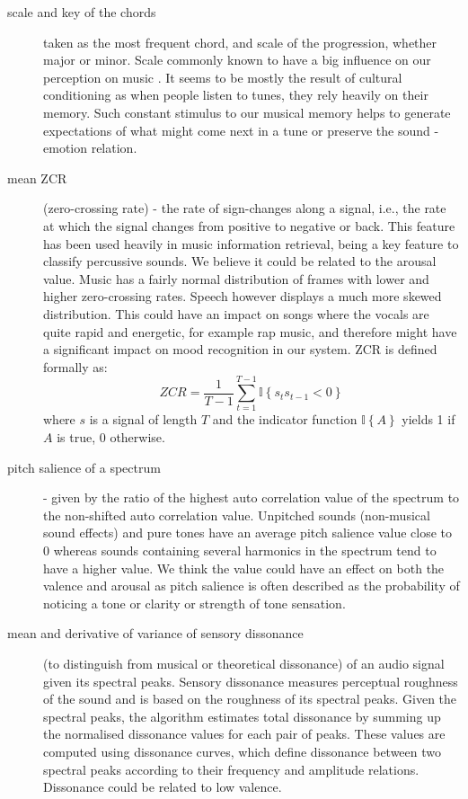 \begin{description}
\item[scale and key of the chords] taken as the most frequent chord, and scale of the progression, whether major or minor. Scale commonly known to have a big influence on our perception on music \cite{keys}. It seems to be mostly the result of cultural conditioning as when people listen to tunes, they rely heavily on their memory. Such constant stimulus to our musical memory helps to generate expectations of what might come next in a tune or preserve the sound - emotion relation.

\item[mean ZCR] (zero-crossing rate) - the rate of sign-changes along a signal, i.e., the rate at which the signal changes from positive to negative or back. This feature has been used heavily in music information retrieval, being a key feature to classify percussive sounds. We believe it could be related to the arousal value. Music has a fairly normal distribution of frames with lower and higher zero-crossing rates. Speech however displays a much more skewed distribution. This could have an impact on songs where the vocals are quite rapid and energetic, for example rap music, and therefore might have a significant impact on mood recognition in our system.
ZCR is defined formally as: 
\begin{equation}
ZCR = \frac{1}{T-1} \sum_{t=1}^{T-1} {{\mathbb I}\left\{{s_t s_{t-1} < 0}\right\}}
\end{equation}
where $s$ is a signal of length $T$ and the indicator function  ${{\mathbb I}\left\{{A}\right\}}$  yields 1 if $A$ is true, 0 otherwise.

\item[pitch salience of a spectrum] - given by the ratio of the highest auto correlation value of the spectrum to the non-shifted auto correlation value.  Unpitched sounds (non-musical sound effects) and pure tones have an average pitch salience value close to 0 whereas sounds containing several harmonics in the spectrum tend to have a higher value. We think the value could have an effect on both the valence and arousal as pitch salience is often described as the probability of noticing a tone or clarity or strength of tone sensation.

\item[mean and derivative of variance of sensory dissonance] (to distinguish from musical or theoretical dissonance) of an audio signal given its spectral peaks. Sensory dissonance measures perceptual roughness of the sound and is based on the roughness of its spectral peaks. Given the spectral peaks, the algorithm estimates total dissonance by summing up the normalised dissonance values for each pair of peaks. These values are computed using dissonance curves, which define dissonance between two spectral peaks according to their frequency and amplitude relations. Dissonance could be related to low valence.

\end{description}

